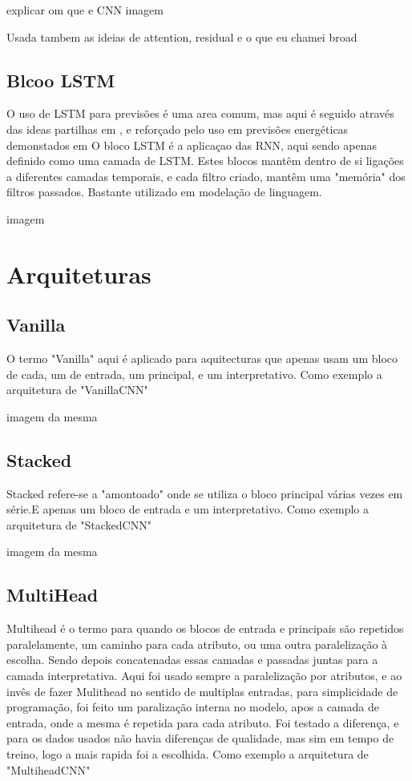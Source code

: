 explicar om que e CNN
imagem

Usada tambem as ideias de attention, residual e o que eu chamei broad


\subsection{Blcoo LSTM}

O uso de LSTM para previsões é uma area comum, mas aqui é seguido através das ideas partilhas em \cite{Hewamalage2021}, e reforçado pelo uso em previsões energéticas demonstados em \cite{Costa2022}
O bloco LSTM é a aplicaçao das RNN, aqui sendo apenas definido como uma camada de LSTM.
Estes blocos mantêm dentro de si ligações a diferentes camadas temporais, e cada filtro criado, mantêm uma "memória" dos filtros passados.
Bastante utilizado em modelação de linguagem.

imagem


\section{Arquiteturas  \label{se:dados_tratamento}}

\subsection{Vanilla \label{se:dados_tratamento}}

O termo "Vanilla" aqui é aplicado para aquitecturas que apenas usam um bloco de cada, um de entrada, um principal, e um interpretativo.
Como exemplo a arquitetura de "VanillaCNN"

imagem da mesma

\subsection{Stacked \label{se:dados_tratamento}}

Stacked refere-se a "amontoado" onde se utiliza o bloco principal várias vezes em série.E apenas um bloco de  entrada e um interpretativo.
Como exemplo a arquitetura de "StackedCNN"

imagem da mesma

\subsection{MultiHead \label{se:dados_tratamento}}

Multihead é o termo para quando os blocos de entrada e principais são repetidos paralelamente, um caminho para cada atributo, ou uma outra paralelização à escolha. Sendo depois concatenadas essas camadas e passadas juntas para a camada interpretativa.
Aqui foi usado sempre a paralelização por atributos, e ao invês de fazer Mulithead no sentido de multiplas entradas, para simplicidade de programação, foi feito um paralização interna no modelo, apos a camada de entrada, onde a mesma é repetida para cada atributo.
Foi testado a diferença, e para os dados usados não havia diferenças de qualidade, mas sim em tempo de treino, logo a mais rapida foi a escolhida.
Como exemplo a arquitetura de "MultiheadCNN"

